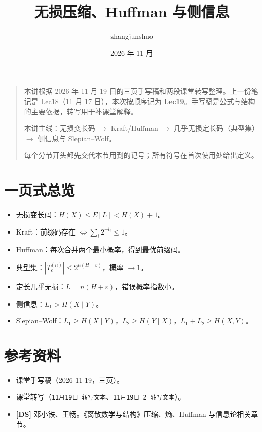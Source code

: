 \documentclass[UTF8,a4paper,11pt]{ctexart}
\title{无损压缩、Huffman 与侧信息}\author{zhangjunshuo}\date{2026 年 11 月}
\begin{document}
\maketitle
\begin{quote}
本讲根据 2026 年 11 月 19 日的三页手写稿和两段课堂转写整理。上一份笔记是 Lec18（11 月 17 日），本次按顺序记为 \textbf{Lec19}。手写稿是公式与结构的主要依据，转写用于补课堂解释。

本讲主线：无损变长码 $\to$ Kraft/Huffman $\to$ 几乎无损定长码（典型集）$\to$ 侧信息与 Slepian--Wolf。

每个分节开头都先交代本节用到的记号；所有符号在首次使用处给出定义。
\end{quote}
\setcounter{tocdepth}{1}
\tableofcontents\clearpage






\section*{一页式总览}
\begin{itemize}
\item 无损变长码：$H(X)\le E[L]<H(X)+1$。
\item Kraft：前缀码存在 $\iff\sum_i2^{-l_i}\le1$。
\item Huffman：每次合并两个最小概率，得到最优前缀码。
\item 典型集：$|T_\varepsilon^{(n)}|\le2^{n(H+\varepsilon)}$，概率 $\to1$。
\item 定长几乎无损：$L=n(H+\varepsilon)$，错误概率指数小。
\item 侧信息：$L_1>H(X\mid Y)$。
\item Slepian--Wolf：$L_1\ge H(X\mid Y)$，$L_2\ge H(Y\mid X)$，$L_1+L_2\ge H(X,Y)$。
\end{itemize}

\section*{参考资料}
\begin{itemize}
\item 课堂手写稿（2026-11-19，三页）。
\item 课堂转写（\texttt{11月19日\_转写文本}、\texttt{11月19日 2\_转写文本}）。
\item \textbf{[DS]} 邓小铁、王畅。《离散数学与结构》压缩、熵、Huffman 与信息论相关章节。
\end{itemize}
\end{document}
